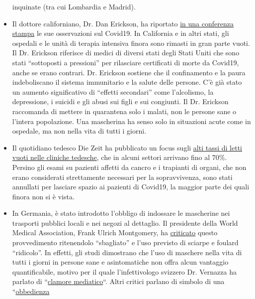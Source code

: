 \begin{itemize}
  inquinate (tra cui Lombardia e Madrid).
\item
  Il dottore californiano, Dr. Dan Erickson, ha riportato
  \href{https://www.turnto23.com/news/coronavirus/video-interview-with-dr-dan-erickson-and-dr-artin-massihi-taken-down-from-youtube}{in
  una conferenza stampa} le sue osservazioni sul Covid19. In California
  e in altri stati, gli ospedali e le unità di terapia intensiva finora
  sono rimasti in gran parte vuoti. Il Dr. Erickson riferisce di medici
  di diversi stati degli Stati Uniti che sono stati ``sottoposti a
  pressioni'' per rilasciare certificati di morte da Covid19, anche se
  erano contrari. Dr. Erickson sostiene che il confinamento e la paura
  indeboliscano il sistema immunitario e la salute delle persone. C'è
  già stato un aumento significativo di ``effetti secondari'' come
  l'alcolismo, la depressione, i suicidi e gli abusi sui figli e sui
  congiunti. Il Dr. Erickson raccomanda di mettere in quarantena solo i
  malati, non le persone sane o l'intera popolazione. Una mascherina ha
  senso solo in situazioni acute come in ospedale, ma non nella vita di
  tutti i giorni.
\item
  Il quotidiano tedesco Die Zeit ha pubblicato un focus sugli
  \href{https://www.zeit.de/2020/18/kliniken-coronavirus-intensivbetten-patienten-behandlung-notaufnahme}{alti
  tassi di letti vuoti nelle cliniche tedesche}, che in alcuni settori
  arrivano fino al 70\%. Persino gli esami su pazienti affetti da cancro
  e i trapianti di organi, che non erano considerati strettamente
  necessari per la sopravvivenza, sono stati annullati per lasciare
  spazio ai pazienti di Covid19, la maggior parte dei quali finora non
  si è vista.
\item
  In Germania, è stato introdotto l'obbligo di indossare le mascherine
  nei trasporti pubblici locali e nei negozi al dettaglio. Il presidente
  della World Medical Association, Frank Ulrich Montgomery, ha
  \href{https://www.aerztezeitung.de/Politik/Montgomery-haelt-Maskenpflicht-fuer-falsch-408844.html}{criticato}
  questo provvedimento ritenendolo ``sbagliato'' e l'uso previsto di
  sciarpe e foulard ``ridicolo''. In effetti, gli studi dimostrano che
  l'uso di maschere nella vita di tutti i giorni in persone sane e
  asintomatiche non offra alcun vantaggio quantificabile, motivo per il
  quale l'infettivologo svizzero Dr. Vernazza ha parlato di
  ``\href{https://infekt.ch/2020/04/atemschutzmasken-fuer-alle-medienhype-oder-unverzichtbar/}{clamore
  mediatico}``. Altri critici parlano di simbolo di una
  ``\href{https://multipolar-magazin.de/artikel/maskenpflicht-gesellschaftliches-klima}{obbedienza
}
\end{itemize}
